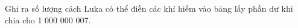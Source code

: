 Ghi ra số lượng cách Luka có thể điền các khí hiếm vào bảng lấy phần dư khi chia cho 1 000 000 007.  

\